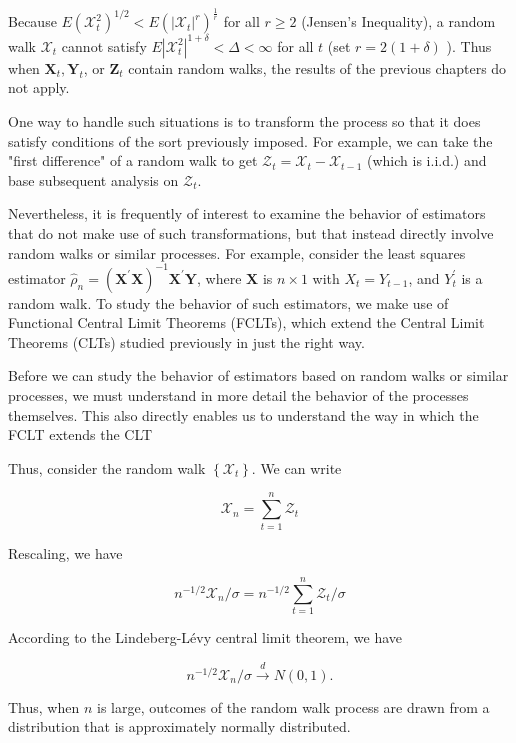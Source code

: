 \documentclass[10pt]{article}
\begin{document}
Because $E\left(\mathcal{X}_{t}^{2}\right)^{1 / 2}<E\left(\left|\mathcal{X}_{t}\right|^{r}\right)^{\frac{1}{r}}$ for all $r \geq 2$ (Jensen's Inequality), a random walk $\mathcal{X}_{t}$ cannot satisfy $E\left|\mathcal{X}_{t}^{2}\right|^{1+\delta}<\Delta<\infty$ for all $t$ (set $r= 2(1+\delta)$ ). Thus when $\mathbf{X}_{t}, \mathbf{Y}_{t}$, or $\mathbf{Z}_{t}$ contain random walks, the results of the previous chapters do not apply.

One way to handle such situations is to transform the process so that it does satisfy conditions of the sort previously imposed. For example, we can take the "first difference" of a random walk to get $\mathcal{Z}_{t}=\mathcal{X}_{t}-\mathcal{X}_{t-1}$ (which is i.i.d.) and base subsequent analysis on $\mathcal{Z}_{t}$.

Nevertheless, it is frequently of interest to examine the behavior of estimators that do not make use of such transformations, but that instead directly involve random walks or similar processes. For example, consider the least squares estimator $\hat{\rho}_{n}=\left(\mathbf{X}^{\prime} \mathbf{X}\right)^{-1} \mathbf{X}^{\prime} \mathbf{Y}$, where $\mathbf{X}$ is $n \times 1$ with $X_{t}=Y_{t-1}$, and $Y_{t}^{\prime}$ is a random walk. To study the behavior of such estimators, we make use of Functional Central Limit Theorems (FCLTs), which extend the Central Limit Theorems (CLTs) studied previously in just the right way.

Before we can study the behavior of estimators based on random walks or similar processes, we must understand in more detail the behavior of the processes themselves. This also directly enables us to understand the way in which the FCLT extends the CLT

Thus, consider the random walk $\left\{\mathcal{X}_{t}\right\}$. We can write

$$
\mathcal{X}_{n}=\sum_{t=1}^{n} \mathcal{Z}_{t}
$$

Rescaling, we have

$$
n^{-1 / 2} \mathcal{X}_{n} / \sigma=n^{-1 / 2} \sum_{t=1}^{n} \mathcal{Z}_{t} / \sigma
$$

According to the Lindeberg-Lévy central limit theorem, we have

$$
n^{-1 / 2} \mathcal{X}_{n} / \sigma \xrightarrow{d} N(0,1) .
$$

Thus, when $n$ is large, outcomes of the random walk process are drawn from a distribution that is approximately normally distributed.
\end{document}
